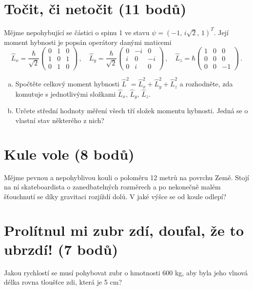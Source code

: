 \documentclass[10pt,a4paper,landscape]{article}
\begin{document}
\begin{multicols}{2}[]
\section{Točit, či netočit (11 bodů)}
Mějme nepohybující se částici o spinu 1 ve stavu $\psi = \left(-1,\, i\sqrt{2},\, 1\right)^T$. Její moment hybnosti je popsán operátory danými maticemi
\begin{equation}
\hat{L}_x = \frac{\hbar}{\sqrt{2}}\begin{pmatrix}0 & 1 & 0\\ 1 & 0 & 1\\ 0 & 1 & 0\end{pmatrix} \,,\quad
\hat{L}_y = \frac{\hbar}{\sqrt{2}}\begin{pmatrix}0 &-i & 0\\ i & 0 &-i\\ 0 & i & 0\end{pmatrix} \,,\quad
\hat{L}_z =       \hbar           \begin{pmatrix}1 & 0 & 0\\ 0 & 0 & 0\\ 0 & 0 &-1\end{pmatrix} \,.
\end{equation}
\begin{enumerate}[a)]
\item Spočtěte celkový moment hybnosti $\hat{L}^2 = \hat{L}_x^2 + \hat{L}_y^2 + \hat{L}_z^2$ a rozhodněte, zda komutuje s jednotlivými složkami $\hat{L}_x,\,\hat{L}_y,\,\hat{L}_z$.
\item Určete střední hodnoty měření všech tří složek momentu hybnosti. Jedná se o vlastní stav některého z nich?
\end{enumerate}

\section{Kule vole (8 bodů)}
Mějme pevnou a nepohyblivou kouli o poloměru 12 metrů na povrchu Země. Stojí na ní skateboardista o zanedbatelných rozměrech a po nekonečně malém šťouchnutí se díky gravitaci rozjíždí dolů. V jaké výšce se od koule odlepí?

\section{Prolítnul mi zubr zdí, doufal, že to ubrzdí! (7 bodů)}
Jakou rychlostí se musí pohybovat zubr o hmotnosti 600 kg, aby byla jeho vlnová délka rovna tloušťce zdi, která je 5 cm?


\end{multicols}
\end{document}
